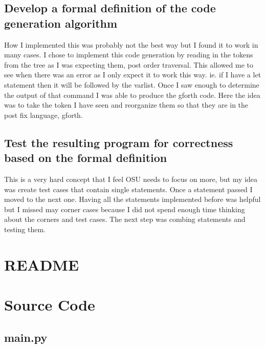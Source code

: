 \documentclass[letterpaper,10pt]{article}
\begin{document}
\subsection{Develop a formal definition of the code generation algorithm} %

\begin{mdframed}[style=MyFrame]
How I implemented this was probably not the best way but I found it to work in many cases. I chose
to implement this code generation by reading in the tokens from the tree as I was expecting them, post order traversal. This allowed me to see when there was an error as I only expect it to work this way. ie. if I have a let statement then it will be followed by the varlist. Once I saw enough to determine the output of that command I was able to produce the gforth code. Here the idea was to take the token I have seen and reorganize them so that they are in the post fix language, gforth. 
\end{mdframed}

\subsection{Test the resulting program for correctness based on the formal definition}

\begin{mdframed}[style=MyFrame]
This is a very hard concept that I feel OSU needs to focus on more, but my idea was create test cases that contain single statements. Once a statement passed I moved to the next one. Having all the statements implemented before was helpful but I missed may corner cases because I did not spend enough time thinking about the corners and test cases. The next step was combing statements and testing them. 
\end{mdframed}

\newpage
\section{README}

\newpage
\section{Source Code}
\subsection{main.py}

\end{document}
